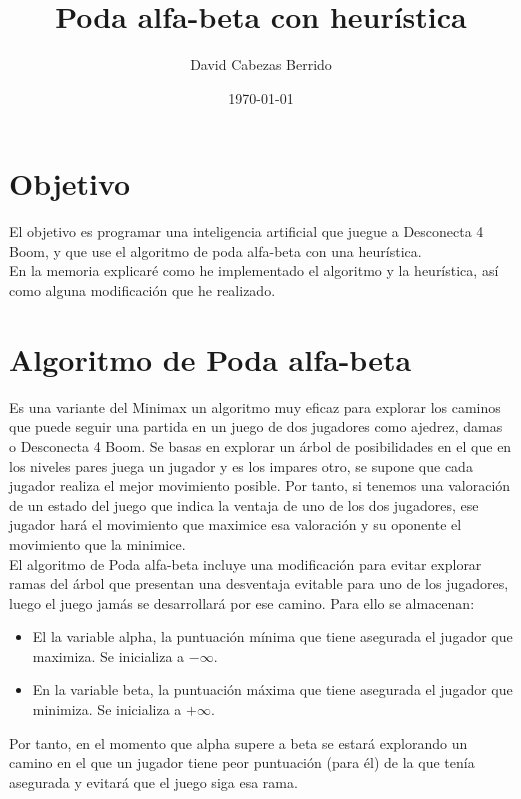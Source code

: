 \documentclass{article}
\begin{document}
\title{Poda alfa-beta con heurística}
\author{David Cabezas Berrido}
\date{\today}
\maketitle
\tableofcontents

\newpage

\section{Objetivo}

El objetivo es programar una inteligencia artificial que juegue a Desconecta 4 Boom, y que use el algoritmo de poda alfa-beta con una heurística. \\

En la memoria explicaré como he implementado el algoritmo y la
heurística, así como alguna modificación que he realizado.


\section{Algoritmo de Poda alfa-beta}

Es una variante del Minimax un algoritmo muy eficaz para explorar los
caminos que puede seguir una partida en un juego de dos jugadores como
ajedrez, damas o Desconecta 4 Boom. Se basas en explorar un árbol de
posibilidades en el que en los niveles pares juega un jugador y es los
impares otro, se supone que cada jugador realiza el mejor movimiento
posible. Por tanto, si tenemos una valoración de un estado del juego
que indica la ventaja de uno de los dos jugadores, ese jugador hará el
movimiento que maximice esa valoración y su oponente el movimiento que
la minimice. \\

El algoritmo de Poda alfa-beta incluye una modificación para evitar
explorar ramas del árbol que presentan una desventaja evitable para
uno de los jugadores, luego el juego jamás se desarrollará por ese
camino. Para ello se almacenan:
\begin{itemize}
\item El la variable alpha, la puntuación mínima que tiene asegurada
  el jugador que maximiza. Se inicializa a $-\infty$.
\item En la variable beta, la puntuación máxima que tiene asegurada el
  jugador que minimiza. Se inicializa a $+\infty$.
\end{itemize}

Por tanto, en el momento que alpha supere a beta se estará explorando
un camino en el que un jugador tiene peor puntuación (para él) de la
que tenía asegurada y evitará que el juego siga esa rama. \\
\end{document}
